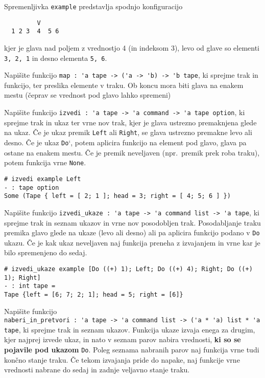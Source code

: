 \documentclass[arhiv]{../izpit}
\begin{document}
Spremenljivka \verb|example| predstavlja spodnjo konfiguracijo

\begin{verbatim}
         V
  1 2 3  4  5 6
\end{verbatim}

kjer je glava nad poljem z vrednostjo 4 (in indeksom 3), levo od glave so elementi \verb|3, 2, 1| in desno elementa \verb|5, 6|.


\podnaloga
Napišite funkcijo \verb|map : 'a tape -> ('a -> 'b) -> 'b tape|, ki sprejme trak in funkcijo, ter preslika elemente v traku. Ob koncu mora biti glava na enakem mestu (čeprav se vrednost pod glavo lahko spremeni)

\podnaloga
Napišite funkcijo \verb|izvedi : 'a tape -> 'a command -> 'a tape option|, ki sprejme trak in ukaz ter vrne nov trak, kjer je glava ustrezno premaknjena glede na ukaz.
Če je ukaz premik \verb|Left| ali \verb|Right|, se glava ustrezno premakne levo ali desno.
Če je ukaz \verb|Do|`, potem aplicira funkcijo na element pod glavo, glava pa ostane na enakem mestu. Če je premik neveljaven (npr.~premik prek roba traku), potem funkcija vrne \verb|None|.

\begin{verbatim}
# izvedi example Left
- : tape option
Some (Tape { left = [ 2; 1 ]; head = 3; right = [ 4; 5; 6 ] })
\end{verbatim}

\podnaloga
Napišite funkcijo \verb|izvedi_ukaze : 'a tape -> 'a command list -> 'a tape|, ki sprejme trak in seznam ukazov in vrne nov posodobljen trak.
Posodabljanje traku premika glavo glede na ukaze (levo ali desno) ali pa aplicira funkcijo podano v \verb|Do| ukazu.
Če je kak ukaz neveljaven naj funkcija preneha z izvajanjem in vrne kar je bilo spremenjeno do sedaj.

\begin{verbatim}
# izvedi_ukaze example [Do ((+) 1); Left; Do ((+) 4); Right; Do ((+) 1); Right]
- : int tape =
Tape {left = [6; 7; 2; 1]; head = 5; right = [6]}
\end{verbatim}

\podnaloga
Napišite funkcijo \\\verb|naberi_in_pretvori : 'a tape -> 'a command list -> ('a * 'a) list * 'a tape|, ki sprejme trak in seznam ukazov. 
Funkcija ukaze izvaja enega za drugim, kjer najprej izvede ukaz, in nato v seznam parov nabira vrednosti, \textbf{ki so se pojavile pod ukazom} \verb|Do|.
Poleg seznama nabranih parov naj funkcija vrne tudi končno stanje traku.
Če tekom izvajanja pride do napake, naj funkcije vrne vrednosti nabrane do sedaj in zadnje veljavno stanje traku. 
\end{document}
